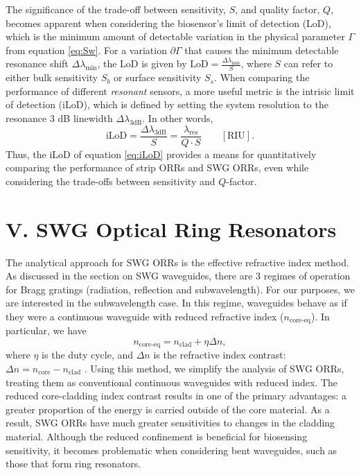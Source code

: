 \documentclass[aps,prl,twocolumn, superscriptaddress,nobalancelastpage]{revtex4}
\begin{document}
The significance of the trade-off between sensitivity, $S$, and quality factor, $Q$, becomes apparent when considering the biosensor's limit of detection (LoD), which is the minimum amount of detectable variation in the physical parameter $\Gamma$ from equation \eqref{eq:Sw}. For a variation $\partial \Gamma$ that causes the minimum detectable resonance shift $\Delta \lambda_\text{min}$, the LoD is given by $\text{LoD} = \frac{\Delta \lambda_\text{min}}{S}$, where $S$ can refer to either bulk sensitivity $S_b$ or surface sensitivity $S_s$. When comparing the performance of different \textit{resonant} sensors, a more useful metric is the intrisic limit of detection (iLoD), which is defined by setting the system resolution to the resonance 3 dB linewidth $\Delta \lambda_\text{3dB}$. In other words, \begin{equation}
\text{iLoD} = \frac{\Delta\lambda_\text{3dB}}{S} = \frac{\lambda_\text{res}}{Q\cdot S} \qquad \left[\text{RIU}\right].
\label{eq:iLoD}
\end{equation}
Thus, the iLoD of equation \eqref{eq:iLoD} provides a means for quantitatively comparing the performance of strip ORRs and SWG ORRs, even while considering the trade-offs between sensitivity and $Q$-factor. 

\section{V. SWG Optical Ring Resonators} %
\vspace{-1em}
The analytical approach for SWG ORRs is the effective refractive index method. As discussed in the section on SWG waveguides, there are 3 regimes of operation for Bragg gratings (radiation, reflection and subwavelength). For our purposes, we are interested in the subwavelength case. In this regime, waveguides behave as if they were a continuous waveguide with reduced refractive index ($n_\text{core-eq}$). In particular, we have
\begin{equation}
    n_\text{core-eq} = n_\text{clad} + \eta \Delta n,
    \label{eq:n_eq}
\end{equation}
where $\eta$ is the duty cycle, and $\Delta n$ is the refractive index contrast:  $\Delta n = n_\text{core} - n_\text{clad}$ \cite{swg3}. Using this method, we simplify the analysis of SWG ORRs, treating them as conventional continuous waveguides with reduced index. The reduced core-cladding index contrast results in one of the primary advantages: a greater proportion of the energy is carried outside of the core material. As a result, SWG ORRs have much greater sensitivities to changes in the cladding material. Although the reduced confinement is beneficial for biosensing sensitivity, it becomes problematic when considering bent waveguides, such as those that form ring resonators.
\end{document}
